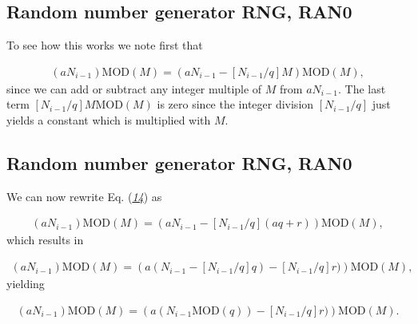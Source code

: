 \documentclass[letterpaper,10pt,english]{sphinxmanual}
\begin{document}
\subsection{Random number generator RNG, RAN0}
\label{\detokenize{chapter2:id10}}
To see how this works we note first that




\begin{equation*}
\begin{split}
\begin{equation}
(aN_{i-1}) \mathrm{MOD} (M)= (aN_{i-1}-[N_{i-1}/q]M)\mathrm{MOD} (M),
\label{eq:rntrick1} \tag{14}
\end{equation}
\end{split}
\end{equation*}
since we can add or subtract any integer multiple of \(M\) from \(aN_{i-1}\).
The last term \([N_{i-1}/q]M\mathrm{MOD}(M)\) is zero since the integer division
\([N_{i-1}/q]\) just yields a constant which is multiplied with \(M\).


\subsection{Random number generator RNG, RAN0}
\label{\detokenize{chapter2:id11}}
We can now rewrite Eq. ({\hyperref[\detokenize{chapter2:eq:rntrick1}]{\emph{14}}}) as




\begin{equation*}
\begin{split}
\begin{equation}
(aN_{i-1}) \mathrm{MOD} (M)= (aN_{i-1}-[N_{i-1}/q](aq+r))\mathrm{MOD} (M),
\label{eq:rntrick2} \tag{15}
\end{equation}
\end{split}
\end{equation*}
which results
in




\begin{equation*}
\begin{split}
\begin{equation}
(aN_{i-1}) \mathrm{MOD} (M)= \left(a(N_{i-1}-[N_{i-1}/q]q)-[N_{i-1}/q]r)\right)\mathrm{MOD} (M),
\label{eq:rntrick3} \tag{16}
\end{equation}
\end{split}
\end{equation*}
yielding




\begin{equation*}
\begin{split}
\begin{equation}
(aN_{i-1}) \mathrm{MOD} (M)= \left(a(N_{i-1}\mathrm{MOD} (q)) -[N_{i-1}/q]r)\right)\mathrm{MOD} (M).
\label{eq:rntrick4} \tag{17}
\end{equation}
\end{split}
\end{equation*}
\end{document}
